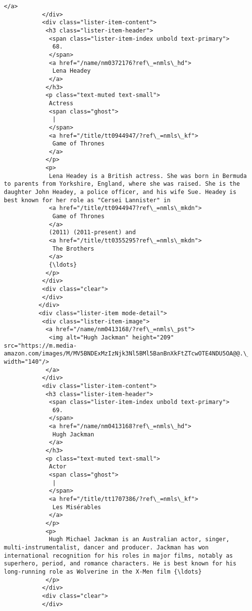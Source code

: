 \documentclass[11pt]{article}
\begin{document}
\begin{Verbatim}[commandchars=\\\{\}]
            </a>
           </div>
           <div class="lister-item-content">
            <h3 class="lister-item-header">
             <span class="lister-item-index unbold text-primary">
              68.
             </span>
             <a href="/name/nm0372176?ref\_=nmls\_hd">
              Lena Headey
             </a>
            </h3>
            <p class="text-muted text-small">
             Actress
             <span class="ghost">
              |
             </span>
             <a href="/title/tt0944947/?ref\_=nmls\_kf">
              Game of Thrones
             </a>
            </p>
            <p>
             Lena Headey is a British actress. She was born in Bermuda to parents from Yorkshire, England, where she was raised. She is the daughter John Headey, a police officer, and his wife Sue. Headey is best known for her role as "Cersei Lannister" in
             <a href="/title/tt0944947?ref\_=nmls\_mkdn">
              Game of Thrones
             </a>
             (2011) (2011-present) and
             <a href="/title/tt0355295?ref\_=nmls\_mkdn">
              The Brothers
             </a>
             {\ldots}
            </p>
           </div>
           <div class="clear">
           </div>
          </div>
          <div class="lister-item mode-detail">
           <div class="lister-item-image">
            <a href="/name/nm0413168/?ref\_=nmls\_pst">
             <img alt="Hugh Jackman" height="209" src="https://m.media-amazon.com/images/M/MV5BNDExMzIzNjk3Nl5BMl5BanBnXkFtZTcwOTE4NDU5OA@@.\_V1\_UX140\_CR0,0,140,209\_AL\_.jpg" width="140"/>
            </a>
           </div>
           <div class="lister-item-content">
            <h3 class="lister-item-header">
             <span class="lister-item-index unbold text-primary">
              69.
             </span>
             <a href="/name/nm0413168?ref\_=nmls\_hd">
              Hugh Jackman
             </a>
            </h3>
            <p class="text-muted text-small">
             Actor
             <span class="ghost">
              |
             </span>
             <a href="/title/tt1707386/?ref\_=nmls\_kf">
              Les Misérables
             </a>
            </p>
            <p>
             Hugh Michael Jackman is an Australian actor, singer, multi-instrumentalist, dancer and producer. Jackman has won international recognition for his roles in major films, notably as superhero, period, and romance characters. He is best known for his long-running role as Wolverine in the X-Men film {\ldots}
            </p>
           </div>
           <div class="clear">
           </div>

\end{Verbatim}
\end{document}
